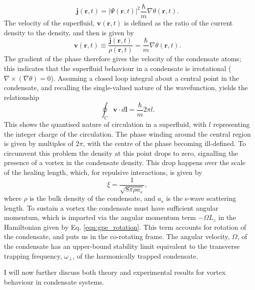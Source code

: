\begin{equation}
\textbf{j}(\textbf{r},t) = \vert\Psi(\textbf{r},t)\vert ^2\frac{\hbar}{m}\nabla\theta(\textbf{r},t).
\end{equation}
The velocity of the superfluid, $\textbf{v}(\textbf{r},t)$ is defined as the ratio of the current density to the density, and then is given by
\begin{equation}\label{eqn:velocity}
\textbf{v}(\textbf{r},t)\equiv \frac{\textbf{j}(\textbf{r},t)}{\rho(\textbf{r},t)} = \frac{\hbar}{m}\nabla\theta(\textbf{r},t).
\end{equation}
The gradient of the phase therefore gives the velocity of the condensate atoms; this indicates that the superfluid behaviour in a condensate is irrotational ($\nabla\times(\nabla\theta) =0$). Assuming a closed loop integral about a central point in the condensate, and recalling the single-valued nature of the wavefunction, yields the relationship
\begin{equation}\label{eqn:circulation}
\oint_C \textbf{v}\cdot d\textbf{l} = \frac{\hbar}{m}2\pi l.
\end{equation}
This shows the quantised nature of circulation in a superfluid, with $l$ representing the integer charge of the circulation. The phase winding around the central region is given by multiples of $2\pi$, with the centre of the phase becoming ill-defined. To circumvent this problem the density at this point drops to zero, signalling the presence of a vortex in the condensate density. This drop happens over the scale of the healing length, which, for repulsive interactions, is given by
\begin{equation}
\xi = \frac{1}{\sqrt{8\pi \rho a_s}},
\end{equation}
where $\rho$ is the bulk density of the condensate, and $a_s$ is the s-wave scattering length.
To sustain a vortex the condensate must have sufficient angular momentum, which is imparted via the angular momentum term $-\Omega L_z$
in the Hamiltonian given by Eq. \eqref{eqn:gpe_rotation}. This term accounts for rotation of the condensate, and puts us in the co-rotating
frame. The angular velocity, $\Omega$, of the condensate has an upper-bound stability limit equivalent to the transverse trapping frequency, $\omega_{\perp}$, of the harmonically trapped condensate.

I will now further discuss both theory and experimental results for vortex behaviour in condensate systems.


